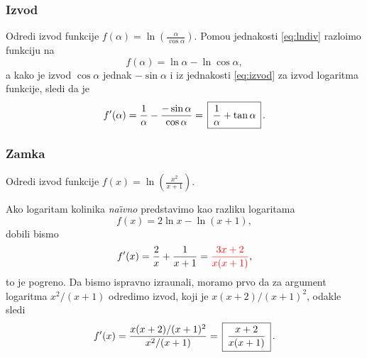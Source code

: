 \subsubsection{Izvod}

\zadatak Odredi izvod funkcije $\displaystyle{f(\alpha)=\ln\left(\frac\alpha{\cos\alpha}\right)}$.
\resenje Pomo{\cc}u jednakosti \eqref{eq:lndiv} razlo{\zv}imo funkciju na 
$$f(\alpha)=\ln\alpha-\ln\cos\alpha,$$ 
a kako je izvod $\cos\alpha$ jednak $-\sin\alpha$ i iz jednakosti 
\eqref{eq:izvod} za izvod logaritma funkcije, sledi da je
$$
f'(\alpha)
=\frac1\alpha-\frac{-\sin\alpha}{\cos\alpha}
=\ram{\frac1\alpha+\tan\alpha}.
$$


\subsubsection{Zamka}

\zadatak Odredi izvod funkcije $\displaystyle {f(x)=\ln\left(\frac{x^2}{x+1}\right)}$.

\resenje Ako logaritam koli{\cv}nika {\sl na\"\i vno\/} predstavimo kao razliku logaritama
$$
f(x) = 2\ln x - \ln (x+1),
$$
dobili bismo 
$$
f'(x) = \frac2x + \frac1{x+1} = {\color{red}\frac{3x+2}{x(x+1)}},
$$
{\sv}to je pogre{\sv}no. Da bismo ispravno izra{\cv}unali, moramo prvo da za argument
logaritma $x^2/(x+1)$ odredimo izvod, koji je $x(x+2)/(x+1)^2$, odakle sledi
$$
f'(x)=\frac{x(x+2)/(x+1)^2}{x^2/(x+1)}=\ram{\frac{x+2}{x(x+1)}}.
$$
